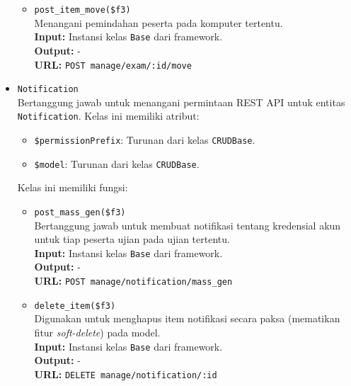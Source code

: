 \begin{itemize}
\begin{itemize}
                \item \texttt{post\_item\_move(\$f3)} \\
                    Menangani pemindahan peserta pada komputer tertentu.\\
                    \textbf{Input:} Instansi kelas \texttt{Base} dari
                    framework.\\
                    \textbf{Output:} -\\
                    \textbf{URL:} \texttt{POST manage/exam/:id/move}
            \end{itemize}
        
        \item \texttt{Notification}\\
            Bertanggung jawab untuk menangani permintaan REST API untuk entitas
            \texttt{Notification}. Kelas ini memiliki atribut:
            \begin{itemize}
                \item \texttt{\$permissionPrefix}: Turunan dari kelas
                \texttt{CRUDBase}.
                \item \texttt{\$model}: Turunan dari kelas \texttt{CRUDBase}.
            \end{itemize}
            Kelas ini memiliki fungsi:
            \begin{itemize}
                \item \texttt{post\_mass\_gen(\$f3)} \\
                    Bertanggung jawab untuk membuat notifikasi tentang
                    kredensial akun untuk tiap peserta ujian pada ujian
                    tertentu. \\
                    \textbf{Input:} Instansi kelas \texttt{Base} dari
                    framework.\\
                    \textbf{Output:} -\\
                    \textbf{URL:} \texttt{POST manage/notification/mass\_gen}
                
                \item \texttt{delete\_item(\$f3)} \\
                    Digunakan untuk menghapus item notifikasi secara paksa
                    (mematikan fitur \textit{soft-delete}) pada model. \\
                    \textbf{Input:} Instansi kelas \texttt{Base} dari
                    framework.\\
                    \textbf{Output:} -\\
                    \textbf{URL:} \texttt{DELETE manage/notification/:id}
                

\end{itemize}
\end{itemize}
